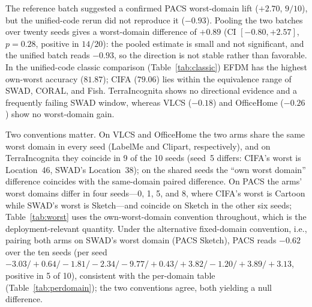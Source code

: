 \documentclass[electronics,article,submit,moreauthors]{Definitions/mdpi}
\begin{document}
The reference batch suggested a confirmed PACS worst-domain lift ($+2.70$, $9/10$), but the unified-code rerun did not reproduce it ($-0.93$). Pooling the two batches over twenty seeds gives a worst-domain difference of $+0.89$ (CI $[-0.80,+2.57]$, $p=0.28$, positive in $14/20$): the pooled estimate is small and not significant, and the unified batch reads $-0.93$, so the direction is not stable rather than favorable. In the unified-code classic comparison (Table~\ref{tab:classic}) EFDM has the highest own-worst accuracy ($81.87$); CIFA ($79.06$) lies within the equivalence range of SWAD, CORAL, and Fish. TerraIncognita shows no directional evidence and a frequently failing SWAD window, whereas VLCS ($-0.18$) and OfficeHome ($-0.26$) show no worst-domain gain.

Two conventions matter. On VLCS and OfficeHome the two arms share the same worst domain in every seed (LabelMe and Clipart, respectively), and on TerraIncognita they coincide in 9 of the 10 seeds (seed~5 differs: CIFA's worst is Location~46, SWAD's Location~38); on the shared seeds the ``own worst domain'' difference coincides with the same-domain paired difference. On PACS the arms' worst domains differ in four seeds---0, 1, 5, and 8, where CIFA's worst is Cartoon while SWAD's worst is Sketch---and coincide on Sketch in the other six seeds; Table~\ref{tab:worst} uses the own-worst-domain convention throughout, which is the deployment-relevant quantity. Under the alternative fixed-domain convention, i.e., pairing both arms on SWAD's worst domain (PACS Sketch), PACS reads $-0.62$ over the ten seeds (per seed $-3.03/+0.64/-1.81/-2.34/-9.77/+0.43/+3.82/-1.20/+3.89/+3.13$, positive in 5 of 10), consistent with the per-domain table (Table~\ref{tab:perdomain}); the two conventions agree, both yielding a null difference.
\end{document}
